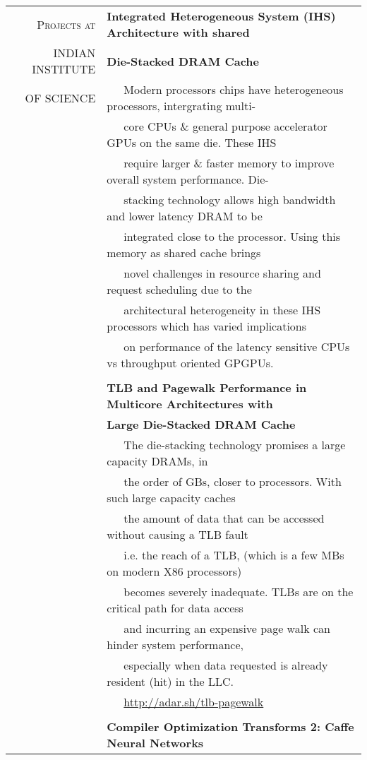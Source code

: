\documentclass[a4paper,10pt]{article} %
\begin{document}
\begin{tabular}{rl}
\textsc{Projects at} & \textbf{Integrated Heterogeneous System (IHS) Architecture with shared} \\
\textsc{INDIAN INSTITUTE} & \textbf{Die-Stacked DRAM Cache \qquad {}} \\
\textsc{OF SCIENCE} & ~~~Modern processors chips have heterogeneous processors, intergrating multi-\\
& ~~~core CPUs \& general purpose accelerator GPUs on the same die. These IHS\\
& ~~~require larger \& faster memory to improve overall system performance. Die-\\
& ~~~stacking technology allows high bandwidth and lower latency DRAM to be\\
& ~~~integrated close to the processor. Using this memory as shared cache brings\\
& ~~~novel challenges in resource sharing and request scheduling due to the\\
& ~~~architectural heterogeneity in these IHS processors which has varied implications\\
& ~~~on performance of the latency sensitive CPUs vs throughput oriented GPGPUs.\\
& \\
& \textbf{TLB and Pagewalk Performance in Multicore Architectures with} \\
& \textbf{Large Die-Stacked DRAM Cache \qquad [TO BE PUBLISHED]}\\
& ~~~The die-stacking technology promises a large capacity DRAMs, in\\
& ~~~the order of GBs, closer to processors. With such large capacity caches\\
& ~~~the amount of data that can be accessed without causing a TLB fault\\
& ~~~i.e. the reach of a TLB, (which is a few MBs on modern X86 processors)\\
& ~~~becomes severely inadequate. TLBs are on the critical path for data access\\
& ~~~and incurring an expensive page walk can hinder system performance,\\
& ~~~especially when data requested is already resident (hit) in the LLC.\\
& ~~~\href{http://adar.sh/tlb-pagewalk}{http://adar.sh/tlb-pagewalk}\\
& \\
& \textbf{Compiler Optimization Transforms 2: Caffe Neural Networks}\\

\end{tabular}
\end{document}
